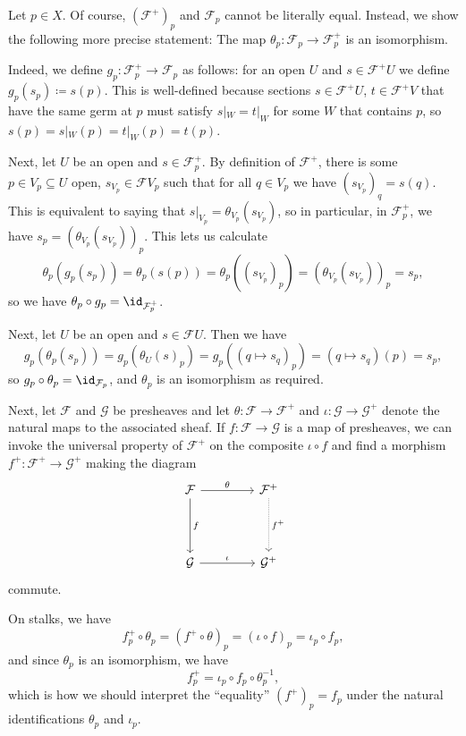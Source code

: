 Let $p \in X$. Of course, $(\mathcal{F}^+)_p$ and $\mathcal{F}_p$
cannot be literally equal. Instead, we show the following more precise
statement: The map $\theta_p\colon \mathcal{F}_p \to \mathcal{F}^+_p$ is an
isomorphism.

Indeed, we define $g_p\colon \mathcal{F}^+_p \to \mathcal{F}_p$ as follows:
for an open $U$ and $s \in \mathcal{F}^+U$ we define $g_p(s_p)\coloneqq s(p)$.
This is well-defined because sections $s \in \mathcal{F}^+U$,
$t \in \mathcal{F}^+V$
that have the same germ at $p$ must satisfy $s|_W = t|_W$ for some $W$ that contains
$p$, so  $s(p) = s|_W(p) = t|_W(p) = t(p)$.

Next, let $U$ be an open and $s \in \mathcal{F}_p^+$. By definition of $\mathcal{F}^+$,
there is some $p \in V_p \subseteq U$ open, $s_{V_p} \in \mathcal{F}V_p$ such that
for all $q \in V_p$ we have $(s_{V_p})_q = s(q)$. This is equivalent to saying
that $s|_{V_p} = \theta_{V_p}(s_{V_p})$, so in particular, in $\mathcal{F}_p^+$, we have
$s_p = (\theta_{V_p}(s_{V_p}))_p$. This lets us calculate
\[ \theta_p(g_p(s_p)) = \theta_p(s(p)) = \theta_p((s_{V_p})_p) = (\theta_{V_p}(s_{V_p}))_p = s_p, \]
so we have $\theta_p \circ g_p = \id_{\mathcal{F}^+_p}$.

Next, let $U$ be an open and $s \in \mathcal{F}U$. Then we have
\[ g_p(\theta_p(s_p)) = g_p(\theta_U(s)_p) = g_p((q\mapsto s_q)_p) = (q\mapsto s_q)(p) = s_p, \]
so $g_p \circ \theta_p = \id_{\mathcal{F}_p}$, and $\theta_p$ is an isomorphism as required.

Next, let $\mathcal{F}$ and $\mathcal{G}$ be presheaves and let $\theta\colon \mathcal{F}\to \mathcal{F}^+$
and $\iota\colon \mathcal{G}\to \mathcal{G}^+$ denote the natural maps to
the associated sheaf. If $f\colon \mathcal{F}\to \mathcal{G}$ is a map of presheaves,
we can invoke the universal property of $\mathcal{F}^+$ on the composite
$\iota \circ f$ and find a morphism
$f^+\colon \mathcal{F}^+ \to \mathcal{G}^+$ making the diagram
\[\begin{tikzcd}[row sep=1.5cm, column sep=1.5cm]
	\mathcal{F}\ar[r, "\theta"]\ar[d, "f"] & \mathcal{F}^+\ar[d, densely dotted, "f^+"]\\
	\mathcal{G}\ar[r, "\iota"] & \mathcal{G}^+
\end{tikzcd}\]
commute.

On stalks, we have
\[ f_p^+ \circ \theta_p = (f^+ \circ \theta)_p = (\iota \circ f)_p = \iota_p \circ f_p, \]
and since $\theta_p$ is an isomorphism, we have
\[ f_p^+ = \iota_p \circ f_p \circ \theta_p^{-1}, \]
which is how we should interpret the \enquote{equality} $(f^+)_p = f_p$ under the
natural identifications $\theta_p$ and $\iota_p$.
